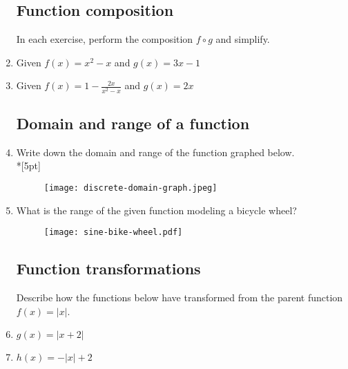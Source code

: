 \documentclass[]{book}
\begin{document}
\begin{enumerate}
\subsection*{Function composition}
In each exercise, perform the composition $f \circ g$ and simplify.
\item Given $f(x)=x^2-x$ and $g(x)=3x-1$
\item Given $\displaystyle f(x)=1-\frac{2x}{x^2-x}$ and $g(x)=2x$

\subsection*{Domain and range of a function}
\item Write down the domain and range of the function graphed below.\\*[5pt]

\begin{figure}[!ht]
    \centering
    \texttt{[image: discrete-domain-graph.jpeg]}
\end{figure}

\item What is the range of the given function modeling a bicycle wheel?

\begin{figure}[!ht]
    \centering
    \texttt{[image: sine-bike-wheel.pdf]}
\end{figure}

\subsection*{Function transformations}
Describe how the functions below have transformed from the parent function $f(x)=|x|$.
\item $g(x)=|x+2|$
\item $h(x)=-|x|+2$

\newpage


\end{enumerate}
\end{document}
